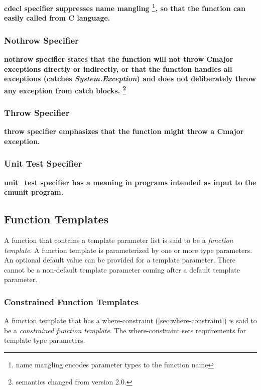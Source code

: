 \documentclass[a4paper,oneside,11pt]{article}
\begin{document}
\bf{cdecl} specifier suppresses name mangling \footnote{name mangling encodes parameter types to the function name},
so that the function can easily called from C language.

\subsubsection{Nothrow Specifier}

\bf{nothrow} specifier states that the function will not throw Cmajor exceptions directly or indirectly,
or that the function handles all exceptions (catches \emph{System.Exception})
and does not deliberately throw any exception from catch blocks. \footnote{semantics changed from version 2.0.}

\subsubsection{Throw Specifier}

\bf{throw} specifier emphasizes that the function might throw a Cmajor exception.

\subsubsection{Unit Test Specifier}

\bf{unit\_test} specifier has a meaning in programs intended as input to the \bf{cmunit} program.

\subsection{Function Templates}

A function that contains a template parameter list is said to be a \emph{function template}.
A function template is parameterized by one or more type parameters.
An optional default value can be provided for a template parameter. There cannot be a non-default
template parameter coming after a default template parameter.

\subsubsection{Constrained Function Templates}

A function template that has a where-constraint (\ref{sec:where-constraint}) is said to be a
\emph{constrained function template}.
The where-constraint sets requirements for template type parameters.
\end{document}
